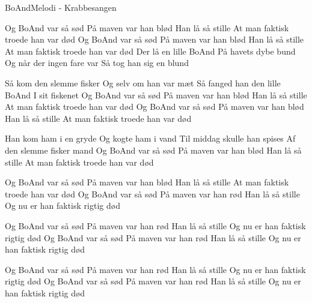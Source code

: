 \begin{sang}{BoAnd}{Melodi - Krabbesangen}
\begin{vers}
Og BoAnd var så sød
På maven var han blød
Han lå så stille
At man faktisk troede han var død
Og BoAnd var så sød
På maven var han blød
Han lå så stille
At man faktisk troede han var død
Der lå en lille BoAnd
På havets dybe bund
Og når der ingen fare var
Så tog han sig en blund
\end{vers}

\begin{vers}
Så kom den slemme fisker
Og selv om han var mæt
Så fanged han den lille BoAnd
I sit fiskenet
Og BoAnd var så sød
På maven var han blød
Han lå så stille
At man faktisk troede han var død
Og BoAnd var så sød
På maven var han blød
Han lå så stille
At man faktisk troede han var død
\end{vers}

\begin{vers}
Han kom ham i en gryde
Og kogte ham i vand
Til middag skulle han spises
Af den slemme fisker mand
Og BoAnd var så sød
På maven var han blød
Han lå så stille
At man faktisk troede han var død
\end{vers}

\begin{vers}
Og BoAnd var så sød
På maven var han blød
Han lå så stille
At man faktisk troede han var død
Og BoAnd var så sød
På maven var han rød
Han lå så stille
Og nu er han faktisk rigtig død
\end{vers}

\begin{vers}
Og BoAnd var så sød
På maven var han rød
Han lå så stille
Og nu er han faktisk rigtig død
Og BoAnd var så sød
På maven var han rød
Han lå så stille
Og nu er han faktisk rigtig død
\end{vers}

\begin{vers}
Og BoAnd var så sød
På maven var han rød
Han lå så stille
Og nu er han faktisk rigtig død
Og BoAnd var så sød
På maven var han rød
Han lå så stille
Og nu er han faktisk rigtig død
\end{vers}
\laps
\end{sang}
